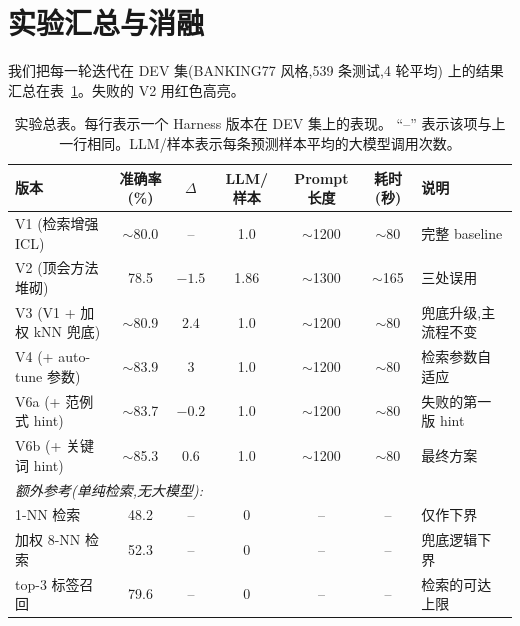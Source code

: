 \documentclass[10pt,twocolumn,letterpaper]{article}
\begin{document}
\section{实验汇总与消融}
\label{sec:experiments}

我们把每一轮迭代在 DEV 集(BANKING77 风格,539 条测试,4 轮平均)
上的结果汇总在表~\ref{tab:total}。失败的 V2 用红色高亮。

\begin{table}[t]
\centering\small
\caption{实验总表。每行表示一个 Harness 版本在 DEV 集上的表现。
``--'' 表示该项与上一行相同。LLM/样本表示每条预测样本平均的大模型调用次数。}
\label{tab:total}
\renewcommand{\arraystretch}{1.15}
\begin{tabular}{lcccccl}
\toprule
\textbf{版本} & \textbf{准确率(\%)} & \textbf{$\Delta$} &
\textbf{LLM/样本} & \textbf{Prompt长度} & \textbf{耗时(秒)} &
\textbf{说明} \\
\midrule
V1 (检索增强 ICL)      & $\sim$80.0             & --          & 1.0  & $\sim$1200   & $\sim$80 & 完整 baseline \\
\rowcolor{red!8}
V2 (顶会方法堆砌)      & 78.5                 & $-1.5$       & 1.86 & $\sim$1300   & $\sim$165 & 三处误用 \\
V3 (V1 + 加权 kNN 兜底)& $\sim$80.9             & $2.4$            & 1.0  & $\sim$1200           & $\sim$80         & 兜底升级,主流程不变 \\
V4 (+ auto-tune 参数)  & $\sim$83.9    & $3$           & 1.0  & $\sim$1200           & $\sim$80         & 检索参数自适应 \\
V6a (+ 范例式 hint)    & $\sim$83.7             & $-0.2$  & 1.0  & $\sim$1200          & $\sim$80         & 失败的第一版 hint \\
V6b (+ 关键词 hint)    & $\sim$85.3   & $0.6$    & 1.0  & $\sim$1200           & $\sim$80         & 最终方案 \\
\midrule
\multicolumn{7}{l}{\emph{额外参考(单纯检索,无大模型):}} \\
1-NN 检索              & 48.2                 & --           & 0    & --           & --         & 仅作下界 \\
加权 8-NN 检索         & 52.3                 & --           & 0    & --           & --         & 兜底逻辑下界 \\
top-3 标签召回         & 79.6                 & --           & 0    & --           & --         & 检索的可达上限 \\
\bottomrule
\end{tabular}
\end{table}
\end{document}
